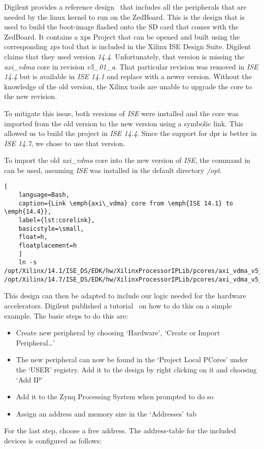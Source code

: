 Digilent provides a reference design~\cite{DigilentReferenceDesign} that
includes all the peripherals that are needed by the linux kernel to run on the
ZedBoard.
This is the design that is used to build the boot-image flashed onto the SD
card that comes with the ZedBoard.
It contains a \gls{xps} Project that can be opened and built using
the corresponding \emph{xps} tool that is included in the Xilinx ISE Design
Suite.
Digilent claims that they used version \emph{14.4}. Unfortunately, that version
is missing the \emph{axi\_vdma} core in revision \emph{v5\_01\_a}.
That particular revision was removed in \emph{ISE 14.4} but is available in
\emph{ISE 14.1} and replace with a newer version.
Without the knowledge of the old version, the Xilinx tools are unable to upgrade
the core to the new revision.

To mitigate this issue, both versions of \emph{ISE} were installed and the core
was imported from the old version to the new version using a symbolic link.
This allowed us to build the project in \emph{ISE 14.4}.
Since the support for \gls{dpr} is better in \emph{ISE 14.7}, we chose to use
that version.

To import the old \emph{axi\_vdma} core into the new version of \emph{ISE}, the
command in  can be used, assuming \emph{ISE} was installed in
the default directory \emph{/opt}.
\begin{lstlisting}[
	language=Bash,
	caption={Link \emph{axi\_vdma} core from \emph{ISE 14.1} to \emph{14.4}},
	label={lst:corelink},
	basicstyle=\small,
	float=h,
	floatplacement=h
	]
	ln -s /opt/Xilinx/14.1/ISE_DS/EDK/hw/XilinxProcessorIPLib/pcores/axi_vdma_v5_01_a /opt/Xilinx/14.7/ISE_DS/EDK/hw/XilinxProcessorIPLib/pcores/axi_vdma_v5_01_a
\end{lstlisting}

This design can then be adapted to include our logic needed for the hardware
accelerators.
Digilent published a tutorial~\cite{DigilentTutorial} on how to do this on a
simple example.
The basic steps to do this are:
\begin{itemize}
	\item Create new peripheral by choosing `Hardware', `Create or Import
		Peripheral\ldots'
	\item The new peripheral can now be found in the `Project Local PCores'
		under the `USER' registry.
		Add it to the design by right clicking on it and choosing `Add IP'
	\item Add it to the Zynq Processing System when prompted to do so
	\item Assign an address and memory size in the `Addresses' tab
\end{itemize}
For the last step, choose a free address.
The address-table for the included devices is configured as follows:

